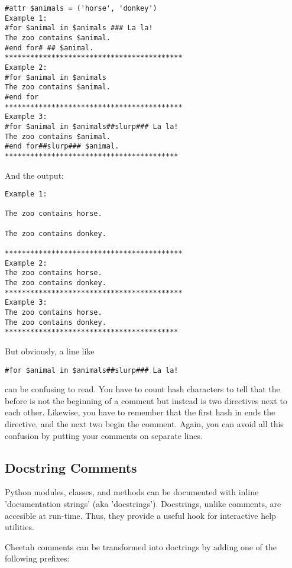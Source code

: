\begin{verbatim}
#attr $animals = ('horse', 'donkey')
Example 1:
#for $animal in $animals ### La la!
The zoo contains $animal.
#end for# ## $animal.
******************************************
Example 2:
#for $animal in $animals
The zoo contains $animal.
#end for
******************************************
Example 3:
#for $animal in $animals##slurp### La la!
The zoo contains $animal.
#end for##slurp### $animal.
*****************************************
\end{verbatim}

And the output:

\begin{verbatim}
Example 1:

The zoo contains horse.

The zoo contains donkey.
 
******************************************
Example 2:
The zoo contains horse.
The zoo contains donkey.
******************************************
Example 3:
The zoo contains horse.
The zoo contains donkey.
*****************************************

\end{verbatim}

But obviously, a line like
\begin{verbatim}
#for $animal in $animals##slurp### La la!
\end{verbatim}
can be confusing to read.  You have to count hash characters to tell that the
\code{\#\#} before  is not the beginning of a comment but instead
is two directives next to each other.  Likewise, you have to remember
that the first hash in \code{\#\#\#} ends the  directive, and the
next two begin the comment.  Again, you can avoid all this confusion by putting
your comments on separate lines.

\subsection{Docstring Comments}
\label{comments.docstring}

Python modules, classes, and methods can be documented with inline
'documentation strings' (aka 'docstrings').  Docstrings, unlike comments, are
accesible at run-time. Thus, they provide a useful hook for interactive help
utilities.  

Cheetah comments can be transformed into doctrings by adding one of the
following prefixes:

